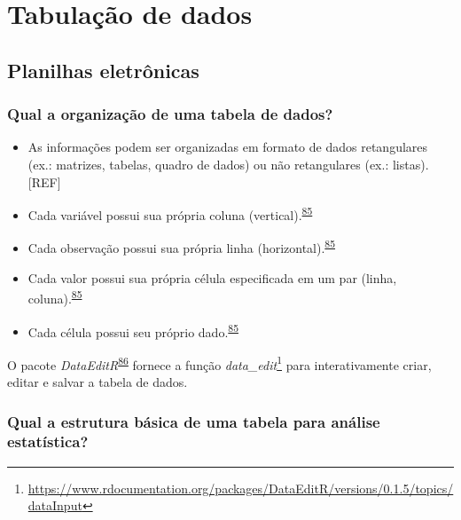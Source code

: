 \documentclass[
  a4paper,
]{book}
\renewcommand{\href}[2]{#2\footnote{\url{#1}}}
\newenvironment{infobox}[1]
  {
  \begin{itemize}
  \renewcommand{\labelitemi}{
    \raisebox{-.7\height}[0pt][0pt]{
      {\setkeys{Gin}{width=3em,keepaspectratio}
        \texttt{[image: \#1]}}
    }
  }
  \setlength{\fboxsep}{1em}
  \begin{blackbox}
  \item
  }
  {
  \end{blackbox}
  \end{itemize}
  }
\begin{document}
\hypertarget{tabulacao-dados}{%
\chapter{\texorpdfstring{\textbf{Tabulação de dados}}{Tabulação de dados}}\label{tabulacao-dados}}

\hypertarget{planilhas}{%
\section{Planilhas eletrônicas}\label{planilhas}}

\hypertarget{qual-a-organizauxe7uxe3o-de-uma-tabela-de-dados}{%
\subsection{Qual a organização de uma tabela de dados?}\label{qual-a-organizauxe7uxe3o-de-uma-tabela-de-dados}}

\begin{itemize}
\item
  As informações podem ser organizadas em formato de dados retangulares (ex.: matrizes, tabelas, quadro de dados) ou não retangulares (ex.: listas).{[}REF{]}
\item
  Cada variável possui sua própria coluna (vertical).\textsuperscript{\protect\hyperlink{ref-tierney2023}{85}}
\item
  Cada observação possui sua própria linha (horizontal).\textsuperscript{\protect\hyperlink{ref-tierney2023}{85}}
\item
  Cada valor possui sua própria célula especificada em um par (linha, coluna).\textsuperscript{\protect\hyperlink{ref-tierney2023}{85}}
\item
  Cada célula possui seu próprio dado.\textsuperscript{\protect\hyperlink{ref-tierney2023}{85}}
\end{itemize}

\begin{infobox}{images/Rlogo}
O pacote \emph{DataEditR}\textsuperscript{\protect\hyperlink{ref-DataEditR}{86}} fornece a função \href{https://www.rdocumentation.org/packages/DataEditR/versions/0.1.5/topics/dataInput}{\emph{data\_edit}} para interativamente criar, editar e salvar a tabela de dados.

\end{infobox}

\hypertarget{qual-a-estrutura-buxe1sica-de-uma-tabela-para-anuxe1lise-estatuxedstica}{%
\subsection{Qual a estrutura básica de uma tabela para análise estatística?}\label{qual-a-estrutura-buxe1sica-de-uma-tabela-para-anuxe1lise-estatuxedstica}}
\end{document}
